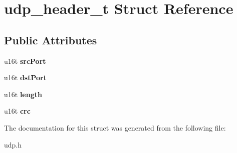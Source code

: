 \hypertarget{structudp__header__t}{}\section{udp\+\_\+header\+\_\+t Struct Reference}
\label{structudp__header__t}
\subsection*{Public Attributes}
\begin{DoxyCompactItemize}
\item 
\mbox{\label{structudp__header__t_a75c64ae2804e9f789e157e914eef7f59}} 
u16t {\bfseries src\+Port}
\item 
\mbox{\label{structudp__header__t_a2bd45c541cea7ceba3a45dd50c06f6a3}} 
u16t {\bfseries dst\+Port}
\item 
\mbox{\label{structudp__header__t_a2525804fef03fb73295d27ee6ada737b}} 
u16t {\bfseries length}
\item 
\mbox{\label{structudp__header__t_a60927678afdb28e824ce916f8299bd01}} 
u16t {\bfseries crc}
\end{DoxyCompactItemize}


The documentation for this struct was generated from the following file\+:\begin{DoxyCompactItemize}
\item 
udp.\+h\end{DoxyCompactItemize}
